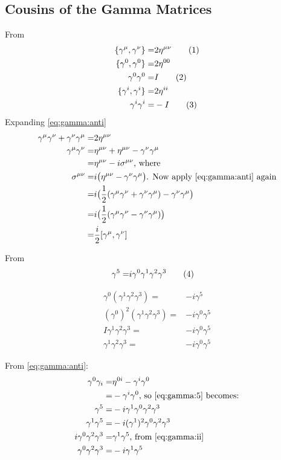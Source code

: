 \documentclass[]{article}
\newcommand\numberthis{\addtocounter{equation}{1}\tag{\theequation}}
\begin{document}
\subsection{Cousins of the Gamma Matrices}

From \cite[II,(2)]{zee2010quantum}
\begin{align*}
	\{\gamma^\mu,\gamma^\nu\}=&2\eta^{\mu\nu} \numberthis \label{eq:gamma:anti}\\
	\{\gamma^0,\gamma^0\}=&2\eta^{00}\\
	\gamma^0\gamma^0=&I  \numberthis \label{eq:gamma:00}\\
	\{\gamma^i,\gamma^i\}=&2\eta^{ii}\\
	\gamma^i\gamma^i=&-I	 \numberthis \label{eq:gamma:ii}
\end{align*}
Expanding \eqref{eq:gamma:anti}
\begin{align*} 
	\gamma^\mu\gamma^\nu + \gamma^\nu\gamma^\mu=&2\eta^{\mu\nu}\\
	\gamma^\mu\gamma^\nu =& \eta^{\mu\nu} + \eta^{\mu\nu} -\gamma^\nu\gamma^\mu\\
	=&\eta^{\mu\nu}-i\sigma^{\mu\nu} \text{, where}\\
	\sigma^{\mu\nu}=&i \big(\eta^{\mu\nu} -\gamma^\nu\gamma^\mu\big) \text{. Now apply \eqref{eq:gamma:anti} again}\\
	=&i\big(\frac{1}{2}(\gamma^\mu\gamma^\nu + \gamma^\nu\gamma^\mu)-\gamma^\nu\gamma^\mu\big)\\
	=&i\big(\frac{1}{2}(\gamma^\mu\gamma^\nu - \gamma^\nu\gamma^\mu)\big)\\
	=&\frac{i}{2}[\gamma^\mu,\gamma^\nu]
\end{align*}

From \cite[II,(7)]{zee2010quantum}
\begin{align*}
	\gamma^5 =& i \gamma^0 \gamma^1 \gamma^2 \gamma^3 \numberthis \label{eq:gamma:5}
\end{align*}

\begin{align*}
	\gamma^0 (\gamma^1 \gamma^2 \gamma^3) =& -i \gamma^5\\
	(\gamma^0)^2 (\gamma^1 \gamma^2 \gamma^3) =& -i \gamma^0 \gamma^5\\
	I \gamma^1 \gamma^2 \gamma^3 =& -i \gamma^0 \gamma^5\\
	\gamma^1 \gamma^2 \gamma^3 =& -i \gamma^0 \gamma^5
\end{align*}

From \eqref{eq:gamma:anti}:
\begin{align*}
	\gamma^0 \gamma_i =& \eta^{0i}-\gamma^i \gamma^0\\
	=& - \gamma^i\gamma^0 \text{, so \eqref{eq:gamma:5} becomes:}\\
	\gamma^5 =& - i \gamma^1 \gamma^0 \gamma^2 \gamma^3\\
	\gamma^1 \gamma^5 =& - i (\gamma^1)^2 \gamma^0 \gamma^2 \gamma^3\\
	i \gamma^0 \gamma^2 \gamma^3 =&\gamma^1 \gamma^5 \text{, from \eqref{eq:gamma:ii}}\\
	\gamma^0 \gamma^2 \gamma^3 =&-i\gamma^1 \gamma^5\\
\end{align*}
\end{document}

